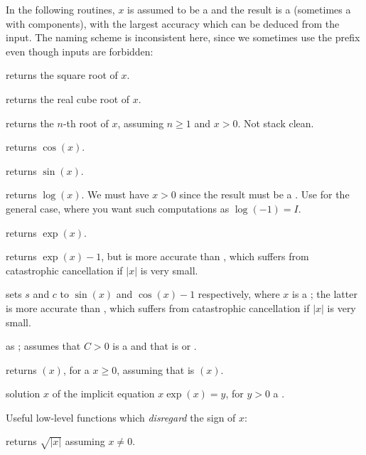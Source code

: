 
In the following routines, $x$ is assumed to be a  and the result
is a  (sometimes a  with  components), with
the largest accuracy which can be deduced from the input. The naming scheme
is inconsistent here, since we sometimes use the prefix  even though
 inputs are forbidden:

 returns the square root of $x$.

 returns the real cube root of $x$.

 returns the $n$-th root of $x$, assuming
$n\geq 1$ and $x > 0$. Not stack clean.

 returns $\cos(x)$.

 returns $\sin(x)$.

 returns $\log(x)$. We must have $x > 0$
since the result must be a . Use  for the general case,
where you want such computations as $\log(-1) = I$.

 returns $\exp(x)$.

 returns $\exp(x)-1$, but is more accurate than
, which suffers from catastrophic cancellation if
$|x|$ is very small.

 sets $s$ and $c$ to
$\sin(x)$ and $\cos(x)-1$ respectively, where $x$ is a ; the latter
is more accurate than , which suffers from
catastrophic cancellation if $|x|$ is very small.

 as ; assumes
that $C > 0$ is a  and that  is  or .

 returns $(x)$, for a 
$x\geq 0$, assuming that  is $(x)$.

 solution $x$ of the implicit equation
$x \exp(x) = y$, for $y > 0$ a .

\noindent Useful low-level functions which \emph{disregard} the sign of $x$:

 returns $\sqrt{|x|}$ assuming $x\neq 0$.

